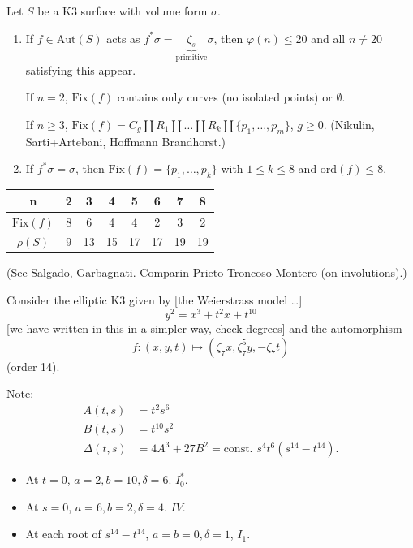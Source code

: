 \begin{proposition}
\label{proposition-restrictions-on-orders}
Let $S$ be a K3 surface
with volume form $\sigma$.
\begin{enumerate}
\item If $f \in \text{Aut}(S)$ acts as
$f^*\sigma=\underbrace{\zeta_s}
_{\text{primitive}}\sigma$,
then $\varphi(n) \leq  20$ and all $n \neq
20$ satisfying
this appear.

If $n=2$, $\text{Fix}(f)$ contains only
curves
(no isolated points) or $\emptyset$.

If $n \geq 3$, $\text{Fix}(f)
=C_g \coprod R_1 \coprod … \coprod R_k
\coprod \{p_1,…,p_m\}$,
$g \geq 0$. (Nikulin, Sarti+Artebani,
Hoffmann Brandhorst.)

\item If $f^*\sigma=\sigma$,
then $\text{Fix}(f)=\{p_1,…,p_k\}$ with $1
\leq k \leq 8$
and $\text{ord}(f) \leq 8$.
\end{enumerate}
\end{proposition}

\begin{center}
\begin{tabular}{c|c c c c c c c}
n & 2&3&4&5&6&7&8\\
\hline
$\text{Fix}(f)$&8&6&4&4&2&3&2\\
$\rho(S)$ &9&13&15&17&17&19&19
\end{tabular}
\end{center}

\noindent
(See Salgado, Garbagnati.
Comparin-Prieto-Troncoso-Montero (on
involutions).)

\begin{example}
\label{example-automorphisms}
Consider the elliptic K3 given by
[the Weierstrass model …]
$$
y^2=x^3+t^2x+t^{10}
$$
[we have written in this in a simpler way,
check degrees]
and the automorphism
$$
f:(x,y,t)\mapsto
(\zeta_7x,\zeta_7^5y,-\zeta_7t)
$$
(order 14).

\noindent
Note:
$$
\begin{aligned}
A(t,s)&=t^2s^6\\
B(t,s)&=t^{10}s^2\\
\Delta(t,s)&=4A^3+27B^2
=\text{const. }s^4t^6(s^{14}-t^{14}).
\end{aligned}
$$

\begin{itemize}
\item At $t=0$,  $a=2,b=10,\delta=6$.
$I_0^*$.

\item At $s=0$, $a=6, b=2, \delta=4$. $IV$.

\item At each root of $s^{14}-t^{14}$,
$a=b=0,\delta=1$, $I_1$.
\end{itemize}

\end{example}


